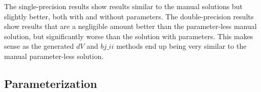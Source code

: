 \begin{table}[h!]
\centering
{}
\caption{CalcSpec generated F\# Alea.cuBase calculations per ms with double precision\label{table:cubaseGenerateddoubletime}}
\end{table}

The single-precision results show results similar to the manual solutions but slightly better, both with and without parameters. 
The double-precision results show results that are a negligible amount better than the parameter-less manual solution, but significantly worse than the solution with parameters.
This makes sense as the generated $dV$ and $bj\_ii$ methods end up being very similar to the manual parameter-less solution.

\subsection{Parameterization}

